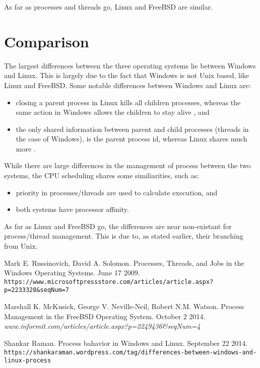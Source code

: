 \documentclass[onecolumn, draftclsnofoot,10pt, compsoc]{IEEEtran}
\begin{document}
	As far as processes and threads go, Linux and FreeBSD are similar.

\section{Comparison}
	The largest differences between the three operating systems lie between Windows and Linux.
	This is largely due to the fact that Windows is not Unix based, like Linux and FreeBSD.
	Some notable differences between Windows and Linux are:
	\begin{itemize}
		\item closing a parent process in Linux kills all children processes, whereas the same action in Windows allows the children to stay alive \cite{windowdiff}, and
		\item the only shared information between parent and child processes (threads in the case of Windows), is the parent process id, whereas Linux shares much more \cite{windowdiff}.
	\end{itemize} 

	While there are large differences in the management of process between the two systems, the CPU scheduling shares some similiarities, such as:
	\begin{itemize}
		\item priority in processes/threads are used to calculate execution, and
		\item both systems have processor affinity.
	\end{itemize}

	As far as Linux and FreeBSD go, the differences are near non-existant for process/thread management.
	This is due to, as stated earlier, their branching from Unix.

\newpage
\begin{thebibliography}{10}
	Mark E. Russinovich, David A. Solomon.
	Processes, Threads, and Jobs in the Windows Operating Systems.
	June 17 2009.
	\\\texttt{https://www.microsoftpressstore.com/articles/article.aspx?p=2233328\&seqNum=7}

	Marshall K. McKusick, George V. Neville-Neil, Robert N.M. Watson.
	Process Management in the FreeBSD Operating System.
	October 2 2014.
	\\\textit{www.informit.com/articles/article.aspx?p=2249436\&seqNum=4}

	Shankar Raman.
	Process bahavior in Windows and Linux.
	September 22 2014.
	\\\texttt{https://shankaraman.wordpress.com/tag/differences-between-windows-and-linux-process}




















\end{thebibliography}
\end{document}
